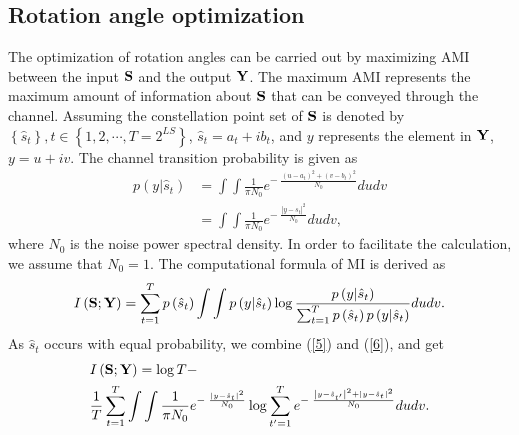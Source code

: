 \documentclass[conference]{IEEEtran}
\begin{document}
\subsection{Rotation angle optimization}
The optimization of rotation angles can be carried out by maximizing AMI between the input ${\bf{S}}$ and the output ${\bf{Y}}$. The maximum AMI represents the maximum amount of information about ${\bf{S}}$ that can be conveyed through the channel. Assuming the constellation point set of ${\bf{S}}$ is denoted by $\left\{ {{\hat s_t}} \right\},t \in \left\{ {1,2, \cdots ,T = {2^{LS}}} \right\}$, ${\hat s_t} = {a_t} + i{b_t}$, and $y$ represents the element in ${\bf{Y}}$, $y = u + iv$. The channel transition probability is given as
\begin{equation}
\begin{aligned}
p(y|{\hat s_t}) &= \int\int{\frac{1}{{\pi {N_0}}}{e^{ - \;\frac{{{{\left( {u - {a_t}} \right)}^2} + {{\left( {v - {b_t}} \right)}^2}}}{{{N_0}}}}}dudv} \\
&= \int\int\frac{1}{{\pi {N_0}}}{e^{ - \;\frac{{{{\left| {y - {\hat s_t}} \right|}^2}}}{{{N_0}}}}}dudv\label{5},
\end{aligned}
\end{equation}
where $N_0$ is the noise power spectral density. In order to facilitate the calculation, we assume that $N_0=1$. The computational formula of MI is derived as
\begin{equation}
\begin{aligned}
I\left( {\bf{S};\bf{Y}} \right) = \sum\limits_{t = 1}^T {p\left( {{\hat s_t}} \right)} \int \int p\left( {y|{\hat s_t}} \right)\log \frac{{p\left( {y|{\hat s_t}} \right)}}{{\sum\nolimits_{t = 1}^T {p\left( {{\hat s_t}} \right)p\left( {y|{\hat s_t}} \right)} }}dudv\label{6}.
\end{aligned}
\end{equation}
As $\hat s_t$ occurs with equal probability, we combine (\ref{5}) and (\ref{6}), and get
\begin{equation}
\begin{aligned}
&I\left( {\bf{S};\bf{Y}} \right) = \log T - \\
&\frac{1}{T}\sum\limits_{t = 1}^T {\int\int\frac{1}{{\pi {N_0}}}{e^{ - \;\frac{{{{\left| {y - {\hat s_t}} \right|}^2}}}{{{N_0}}}}}\log \sum\limits_{t' = 1}^T {{e^{ - \;\frac{{{{\left| {y - {\hat s_{t'}}} \right|}^2} + {{\left| {y - {\hat s_t}} \right|}^2}}}{{{N_0}}}}}} dudv}\label{7}.
\end{aligned}
\end{equation}
\end{document}
